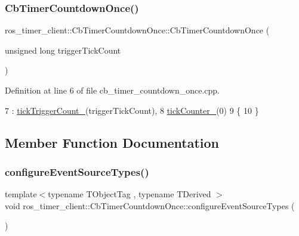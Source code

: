 \subsubsection{\texorpdfstring{Cb\+Timer\+Countdown\+Once()}{CbTimerCountdownOnce()}}
{\footnotesize\ttfamily ros\+\_\+timer\+\_\+client\+::\+Cb\+Timer\+Countdown\+Once\+::\+Cb\+Timer\+Countdown\+Once (\begin{DoxyParamCaption}\item[{unsigned long}]{trigger\+Tick\+Count }\end{DoxyParamCaption})}



Definition at line 6 of file cb\+\_\+timer\+\_\+countdown\+\_\+once.\+cpp.


\begin{DoxyCode}
7     : \hyperlink{classros__timer__client_1_1CbTimerCountdownOnce_a450455322b6158895c709f25a19d464d}{tickTriggerCount\_}(triggerTickCount),
8       \hyperlink{classros__timer__client_1_1CbTimerCountdownOnce_a54fbda19dd432efc2a06014bbc88528c}{tickCounter\_}(0)
9 \{
10 \}
\end{DoxyCode}


\subsection{Member Function Documentation}
\mbox{\label{classros__timer__client_1_1CbTimerCountdownOnce_afe77e4b3a1cb798651426da4a720cff4}} 
\subsubsection{\texorpdfstring{configure\+Event\+Source\+Types()}{configureEventSourceTypes()}}
{\footnotesize\ttfamily template$<$typename T\+Object\+Tag , typename T\+Derived $>$ \\
void ros\+\_\+timer\+\_\+client\+::\+Cb\+Timer\+Countdown\+Once\+::configure\+Event\+Source\+Types (\begin{DoxyParamCaption}{ }\end{DoxyParamCaption})\hspace{0.3cm}{\ttfamily [inline]}}



